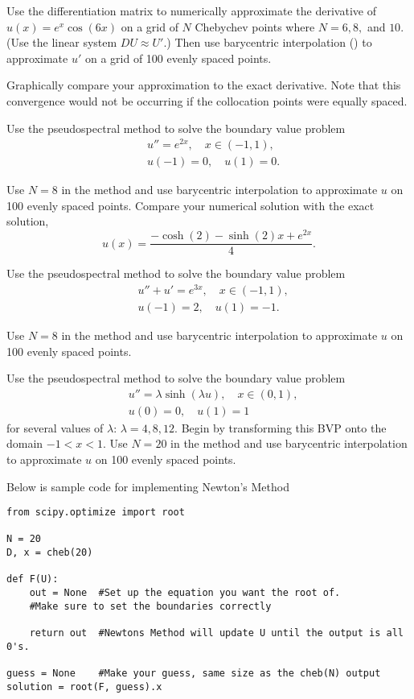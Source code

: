 
Use the differentiation matrix to numerically approximate the derivative of $u(x) = e^{x}\cos(6x)$ on a grid of $N$ Chebychev points where $N=6, 8,$ and $10.$
(Use the linear system $D U \approx U'$.)
Then use barycentric interpolation () to approximate $u'$ on a grid of 100 evenly spaced points.

Graphically compare your approximation to the exact derivative.
Note that this convergence would not be occurring if the collocation points were equally spaced.

Use the pseudospectral method to solve the boundary value problem
\begin{align*}
&{ } u'' = e^{2x}, \quad x \in (-1,1), \\
&{ } u(-1) = 0, \quad u(1) = 0.
\end{align*}

Use $N=8$ in the  method and use barycentric interpolation to approximate $u$ on 100 evenly spaced points.
Compare your numerical solution with the exact solution,
\[
u(x) = \frac{- \cosh(2) - \sinh(2)x + e^{2x}}{4}.
\]

	Use the pseudospectral method to solve the boundary value problem
	\begin{align*}
	&{ } u'' + u' = e^{3x}, \quad x \in (-1,1), \\
	&{ } u(-1) = 2, \quad u(1) = -1.
	\end{align*}
	
	Use $N=8$ in the  method and use barycentric interpolation to approximate $u$ on 100 evenly spaced points.

Use the pseudospectral method to solve the boundary value problem
\begin{align*}
&{ } u'' = \lambda\sinh(\lambda u), \quad x \in (0,1), \\
&{ } u(0) = 0, \quad u(1) = 1
\end{align*}
for several values of $\lambda$: $\lambda = 4, 8, 12$. 
Begin by transforming this BVP onto the domain $-1<x<1$.
Use $N=20$ in the  method and use barycentric interpolation to approximate $u$ on 100 evenly spaced points.
 
Below is sample code for implementing Newton's Method
\begin{lstlisting}
from scipy.optimize import root

N = 20
D, x = cheb(20)

def F(U):
	out = None	#Set up the equation you want the root of.
	#Make sure to set the boundaries correctly
	
	return out	#Newtons Method will update U until the output is all 0's.

guess = None    #Make your guess, same size as the cheb(N) output
solution = root(F, guess).x 
\end{lstlisting}

